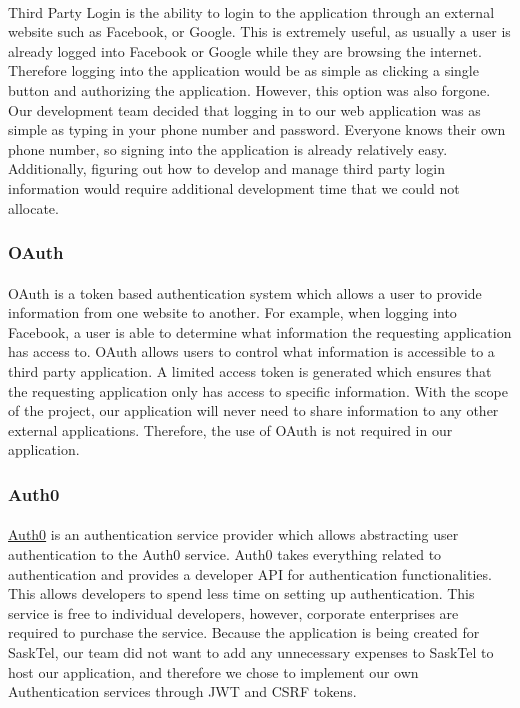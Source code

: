 \documentclass[12pt]{article}
\begin{document}
	\paragraph{}
		Third Party Login is the ability to login to the application through an external website such as Facebook, or Google. This is extremely useful, as usually a user is already logged into Facebook or Google while they are browsing the internet. Therefore logging into the application would be as simple as clicking a single button and authorizing the application. However, this option was also forgone. Our development team decided that logging in to our web application was as simple as typing in your phone number and password. Everyone knows their own phone number, so signing into the application is already relatively easy. Additionally, figuring out how to develop and manage third party login information would require additional development time that we could not allocate.
	
	\subsubsection{OAuth}
	\paragraph{}
		OAuth is a token based authentication system which allows a user to provide information from one website to another. For example, when logging into Facebook, a user is able to determine what information the requesting application has access to. OAuth allows users to control what information is accessible to a third party application. A limited access token is generated which ensures that the requesting application only has access to specific information. With the scope of the project, our application will never need to share information to any other external applications. Therefore, the use of OAuth is not required in our application.
		
	\subsubsection{Auth0}
	\paragraph{}
		\href{https://auth0.com/}{Auth0} is an authentication service provider which allows abstracting user authentication to the Auth0 service. Auth0 takes everything related to authentication and provides a developer API for authentication functionalities. This allows developers to spend less time on setting up authentication. This service is free to individual developers, however, corporate enterprises are required to purchase the service. Because the application is being created for SaskTel, our team did not want to add any unnecessary expenses to SaskTel to host our application, and therefore we chose to implement our own Authentication services through JWT and CSRF tokens.
		
\end{document}
